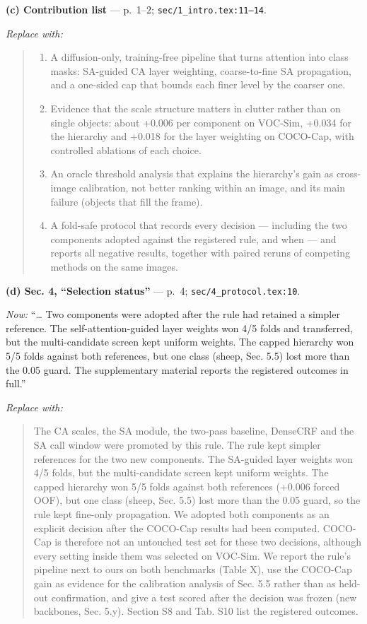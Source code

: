 \documentclass[
  10pt,
]{article}
\providecommand{\tightlist}{%
  \setlength{\itemsep}{0pt}\setlength{\parskip}{0pt}}
\begin{document}
\textbf{(c) Contribution list} --- p.~1--2;
\texttt{sec/1\_intro.tex:11--14}.

\emph{Replace with:}

\begin{quote}
\begin{enumerate}
\def\labelenumi{\arabic{enumi}.}
\tightlist
\item
  A diffusion-only, training-free pipeline that turns attention into
  class masks: SA-guided CA layer weighting, coarse-to-fine SA
  propagation, and a one-sided cap that bounds each finer level by the
  coarser one.
\item
  Evidence that the scale structure matters in clutter rather than on
  single objects: about +0.006 per component on VOC-Sim, +0.034 for the
  hierarchy and +0.018 for the layer weighting on COCO-Cap, with
  controlled ablations of each choice.
\item
  An oracle threshold analysis that explains the hierarchy's gain as
  cross-image calibration, not better ranking within an image, and its
  main failure (objects that fill the frame).
\item
  A fold-safe protocol that records every decision --- including the two
  components adopted against the registered rule, and when --- and
  reports all negative results, together with paired reruns of competing
  methods on the same images.
\end{enumerate}
\end{quote}

\textbf{(d) Sec. 4, ``Selection status''} --- p.~4;
\texttt{sec/4\_protocol.tex:10}.

\emph{Now:} ``\ldots{} Two components were adopted after the rule had
retained a simpler reference. The self-attention-guided layer weights
won 4/5 folds and transferred, but the multi-candidate screen kept
uniform weights. The capped hierarchy won 5/5 folds against both
references, but one class (sheep, Sec. 5.5) lost more than the 0.05
guard. The supplementary material reports the registered outcomes in
full.''

\emph{Replace with:}

\begin{quote}
The CA scales, the SA module, the two-pass baseline, DenseCRF and the SA
call window were promoted by this rule. The rule kept simpler references
for the two new components. The SA-guided layer weights won 4/5 folds,
but the multi-candidate screen kept uniform weights. The capped
hierarchy won 5/5 folds against both references (+0.006 forced OOF), but
one class (sheep, Sec. 5.5) lost more than the 0.05 guard, so the rule
kept fine-only propagation. We adopted both components as an explicit
decision after the COCO-Cap results had been computed. COCO-Cap is
therefore not an untouched test set for these two decisions, although
every setting inside them was selected on VOC-Sim. We report the rule's
pipeline next to ours on both benchmarks (Table X), use the COCO-Cap
gain as evidence for the calibration analysis of Sec. 5.5 rather than as
held-out confirmation, and give a test scored after the decision was
frozen (new backbones, Sec. 5.y). Section S8 and Tab. S10 list the
registered outcomes.
\end{quote}
\end{document}
